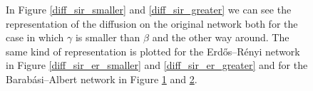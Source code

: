 \begin{figure}
\begin{subfigure}{0.33\textwidth}
        \end{subfigure}
        \begin{subfigure}{0.33\textwidth}
            \caption{}
            \label{diff_sir_ba_smaller}
        \end{subfigure}
        \begin{subfigure}{0.33\textwidth}
            \caption{}
            \label{diff_sir_ba_greater}
        \end{subfigure}
        \caption{In Figure \ref{diff_sir_smaller} and \ref{diff_sir_greater} we can see the representation of the
        diffusion on the original network both for the case in which $\gamma$ is smaller than $\beta$ and the other
        way around. The same kind of representation is plotted for the Erdős–Rényi network in Figure
        \ref{diff_sir_er_smaller} and \ref{diff_sir_er_greater} and for the Barabási–Albert network in Figure
        \ref{diff_sir_ba_smaller} and \ref{diff_sir_ba_greater}.}
        \label{diff_sir_total}
    \end{figure}

